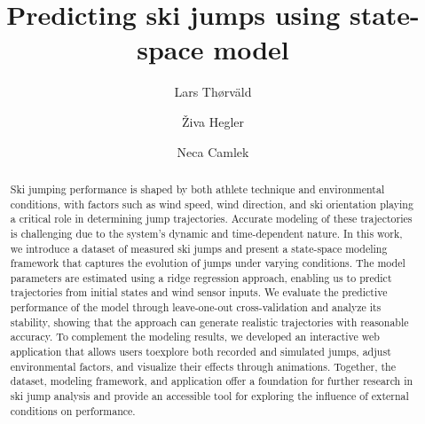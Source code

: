 \documentclass[sigconf,natbib=false, language=english]{acmart}
\begin{document}
\title[Ski Jumping Simulation]{Predicting ski jumps using state-space model}



\author{Lars Th{\o}rv{\"a}ld}

\author{Živa Hegler}

\author{Neca Camlek}

\renewcommand{\shortauthors}{Živa Hegler and Neca Camlek}


\begin{abstract}

Ski jumping performance is shaped by both athlete technique and environmental 
conditions, with factors such as wind speed, wind direction, and ski orientation 
playing a critical role in determining jump trajectories. Accurate modeling of 
these trajectories is challenging due to the system’s dynamic and time-dependent\linebreak
nature. In this work, we introduce a dataset of measured ski jumps and present a 
state-space modeling framework that captures the evolution of jumps under varying 
conditions. The model parameters are estimated using a ridge regression approach, 
enabling us to predict trajectories from initial states and wind sensor inputs. 
We evaluate the predictive performance of the model through leave-one-out cross-validation 
and analyze its stability, showing that the approach can generate realistic trajectories 
with reasonable accuracy. To complement the modeling results, we developed an interactive 
web application that allows users to\linebreak explore both recorded and simulated jumps, adjust 
environmental factors, and visualize their effects through animations. Together, the 
dataset, modeling framework, and application offer a foundation for further research in 
ski jump analysis and provide an accessible tool for exploring the influence of external 
conditions on performance.

\end{abstract}
\end{document}
